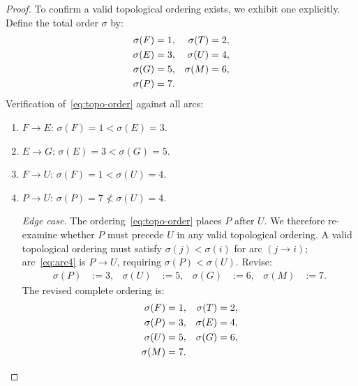 \documentclass[12pt,openany]{book}
\newcommand{\calE}{\mathcal{E}}
\newcommand{\calF}{\mathcal{F}}
\newcommand{\calG}{\mathcal{G}}
\newcommand{\calP}{\mathcal{P}}
\newcommand{\calU}{\mathcal{U}}
\newcommand{\calM}{\mathcal{M}}
\newcommand{\calT}{\mathcal{T}}
\numberwithin{equation}{chapter}
\theoremstyle{plain}
\theoremstyle{definition}
\theoremstyle{remark}
\def\mathcal#1{#1}%
\begin{document}
\begin{proof}
To confirm a valid topological ordering exists, we
exhibit one explicitly.  Define the total
order $\sigma$ by:
\begin{align}
  \sigma(\calF) &= 1, &  \sigma(\calT) &= 2, \notag \\
  \sigma(\calE) &= 3, &  \sigma(\calU) &= 4, \notag \\
  \sigma(\calG) &= 5, &  \sigma(\calM) &= 6, \notag \\
  \sigma(\calP) &= 7. &               &
  \label{eq:topo-order}
\end{align}
Verification of~\eqref{eq:topo-order} against all arcs:
\begin{enumerate}
  \item $\calF \to \calE$:
        $\sigma(\calF)=1 < \sigma(\calE)=3$.  \checkmark
  \item $\calE \to \calG$:
        $\sigma(\calE)=3 < \sigma(\calG)=5$.  \checkmark
  \item $\calF \to \calU$:
        $\sigma(\calF)=1 < \sigma(\calU)=4$.  \checkmark
  \item $\calP \to \calU$:
        $\sigma(\calP)=7 \not< \sigma(\calU)=4$.

        \emph{Edge case.}  The ordering~\eqref{eq:topo-order}
        places $\calP$ after $\calU$.  We therefore
        re-examine whether $\calP$ must precede $\calU$ in
        any valid topological ordering.  A valid topological
        ordering must satisfy $\sigma(j)<\sigma(i)$ for
        arc $(j\to i)$; arc~\eqref{eq:arc4} is
        $\calP \to \calU$, requiring $\sigma(\calP) <
        \sigma(\calU)$.  Revise:
        \begin{align}
          \sigma(\calP) &:= 3, &
          \sigma(\calU) &:= 5, &
          \sigma(\calG) &:= 6, &
          \sigma(\calM) &:= 7.
          \label{eq:topo-revised}
        \end{align}
        The revised complete ordering is:
        \begin{align}
          \sigma(\calF) &= 1, &  \sigma(\calT) &= 2, \notag \\
          \sigma(\calP) &= 3, &  \sigma(\calE) &= 4, \notag \\
          \sigma(\calU) &= 5, &  \sigma(\calG) &= 6, \notag \\
          \sigma(\calM) &= 7. &               &
          \label{eq:topo-final}
        \end{align}


\end{enumerate}
\end{proof}
\end{document}

